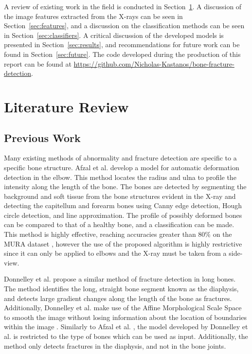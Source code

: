 \documentclass{IEEEtran}
\begin{document}
	A review of existing work in the field is conducted in Section~\ref{sec:litrev}. A discussion of the image features extracted from the X-rays can be seen in Section~\ref{sec:features}, and a discussion on the classification methods can be seen in Section~\ref{sec:classifiers}. A critical discussion of the developed models is presented in Section~\ref{sec:results}, and recommendations for future work can be found in Section~\ref{sec:future}. The code developed during the production of this report can be found at \url{https://github.com/Nicholas-Kastanos/bone-fracture-detection}. 
	
	\section{Literature Review}\label{sec:litrev}
	
	\subsection{Previous Work}
	
	Many existing methods of abnormality and fracture detection are specific to a specific bone structure. Afzal et al. \cite{mashalafzalmmoazzamjawaidrizwanbadarbalochsanamnarejo2020} develop a model for automatic deformation detection in the elbow. This method locates the radius and ulna to profile the intensity along the length of the bone. The bones are detected by segmenting the background and soft tissue from the bone structures evident in the X-ray and detecting the capitellum and forearm bones using Canny edge detection, Hough circle detection, and line approximation. The profile of possibly deformed bones can be compared to that of a healthy bone, and a classification can be made. This method is highly effective, reaching accuracies greater than $80\%$ on the MURA dataset \cite{rajpurkar2017mura}, however the use of the proposed algorithm is highly restrictive since it can only be applied to elbows and the X-ray must be taken from a side-view.
	
	Donnelley et al. \cite{donnelleyandknowles} propose a similar method of fracture detection in long bones. The method identifies the long, straight bone segment known as the diaphysis, and detects large gradient changes along the length of the bone as fractures. Additionally, Donnelley et al. make use of the Affine Morphological Scale Space to smooth the image without losing information about the location of boundaries within the image \cite{donnelleyandknowles,amss}. Similarly to Afzal et al. \cite{mashalafzalmmoazzamjawaidrizwanbadarbalochsanamnarejo2020}, the model developed by Donnelley et al. \cite{donnelleyandknowles} is restricted to the type of bones which can be used as input. Additionally, the method only detects fractures in the diaphysis, and not in the bone joints.
	
\end{document}
